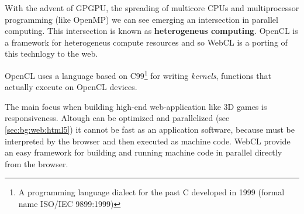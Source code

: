 With the advent of \ac{GPGPU}, the spreading of multicore CPUs and multiprocessor programming (like OpenMP)
we can see emerging an intersection in parallel computing. This intersection is known as
\textbf{heterogeneus computing}. \ac{OpenCL} is a framework for heterogeneus compute resources and so
\ac{WebCL} is a porting of this technlogy to the web.

\ac{OpenCL} uses a language based on C99\footnote{A programming language dialect for the past C developed in
1999 (formal name ISO/IEC 9899:1999)} for writing \emph{kernels}, functions that actually execute on OpenCL
devices. 

The main focus when building high-end web-application like 3D games is responsiveness. Altough \js{}
can be optimized and parallelized (see \vref{sec:bg:web:html5}) it cannot be fast as an application
software, because \js{} must be interpreted by the browser and then executed as machine code. \ac{WebCL}
provide an easy framework for building and running machine code in parallel directly from the browser.


